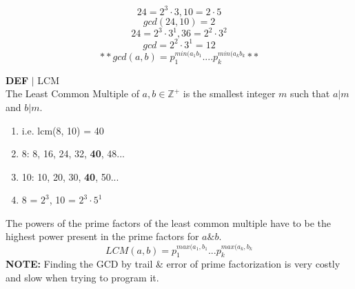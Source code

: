 \documentclass [12pt]{article}
\begin{document}
\[24=2^3\cdot3, 10=2\cdot 5\]
\[gcd(24,10)=2\]
\[24 = 2^3\cdot3^1, 36 = 2^2\cdot3^2\]
\[gcd = 2^2\cdot 3^1 = 12\]
\[** gcd (a,b) = p_1^{min(a_1b_1}....p_k^{min(a_kb_k}**\]
\vspace{0.2in}
\begin{framed}
\noindent\textbf{DEF} $|$ LCM\\
The Least Common Multiple of $a,b\in\mathbb{Z^+}$ is the smallest integer $m$ such that $a|m$ and $b|m$.
\begin{enumerate}[\quad]
    \item  i.e. lcm(8, 10) = 40
    \item 8: 8, 16, 24, 32, \textbf{40}, 48...
    \item 10: 10, 20, 30, \textbf{40}, 50...
    \item 8 = $2^3$, 10 = $2^3\cdot5^1$
\end{enumerate}
The powers of the prime factors of the least common multiple have to be the highest power present in the prime factors for $a\& b$.
\[LCM (a,b) = p_1^{max(a_1,b_1}...p_k^{max(a_k,b_k}\]
\textbf{NOTE: } Finding the GCD by trail \& error of prime factorization is very costly and slow when trying to program it.
\end{framed}
\end{document}
